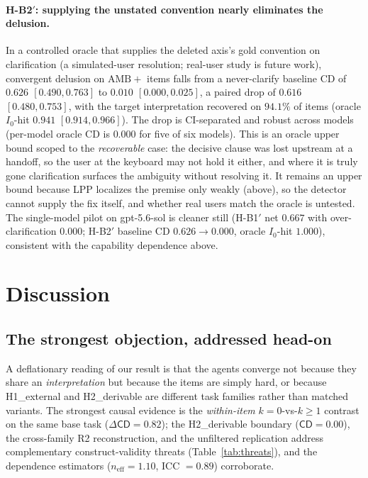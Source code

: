 \documentclass[acmsmall,screen,review,anonymous]{acmart}
\newcommand{\cd}{\textsf{CD}}
\newcommand{\neff}{\ensuremath{n_{\mathrm{eff}}}}
\begin{document}
\paragraph{H-B2$'$: supplying the unstated convention nearly eliminates the delusion.} In a controlled
oracle that supplies the deleted axis's gold convention on clarification (a simulated-user resolution;
real-user study is future work), convergent delusion on $\mathrm{AMB}{+}$ items falls from a never-clarify
baseline \cd{} of \textbf{$0.626$ $[0.490, 0.763]$} to \textbf{$0.010$ $[0.000, 0.025]$}, a paired drop of
$0.616$ $[0.480, 0.753]$, with the target interpretation recovered on $94.1\%$ of items (oracle $I_0$-hit
$0.941$ $[0.914, 0.966]$). The drop is CI-separated and robust across models (per-model oracle \cd{} is
$0.000$ for five of six models). This is an oracle upper bound scoped to the \emph{recoverable} case: the
decisive clause was lost upstream at a handoff, so the user at the keyboard may not hold it either, and where
it is truly gone clarification surfaces the ambiguity without resolving it. It remains an upper bound because
LPP localizes the premise only weakly (above), so the detector cannot supply the fix itself, and whether real
users match the oracle is untested.
The single-model pilot on gpt-5.6-sol is cleaner still (H-B1$'$ net $0.667$ with over-clarification $0.000$;
H-B2$'$ baseline \cd{} $0.626\!\to\!0.000$, oracle $I_0$-hit $1.000$), consistent with the capability
dependence above.

\section{Discussion}
\label{sec:discussion}
\subsection{The strongest objection, addressed head-on}
A deflationary reading of our result is that the agents converge not because they share an
\emph{interpretation} but because the items are simply hard, or because H1\_external and H2\_derivable are
different task families rather than matched variants. The strongest causal evidence is the \emph{within-item}
$k{=}0$-vs-$k{\ge}1$ contrast on the same base task ($\Delta\cd=0.82$); the H2\_derivable boundary
($\cd=0.00$), the cross-family R2 reconstruction, and the unfiltered replication address complementary
construct-validity threats (Table~\ref{tab:threats}), and the dependence estimators ($\neff=1.10$,
ICC $=0.89$) corroborate.
\end{document}
